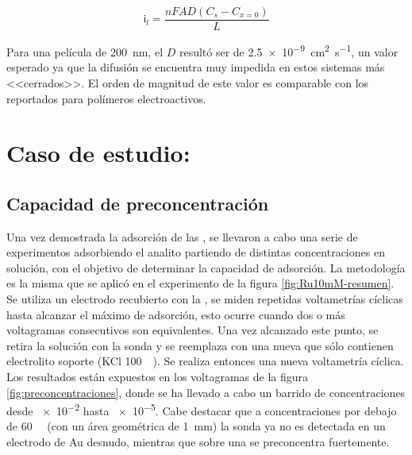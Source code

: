 			\begin{equation}
					\text{i}_l = \frac{nFAD(C_{s}-C_{x=0})}{L}
					\label{eq:de-ferroceno-bajaT}
			\end{equation}
			  	

		Para una película de \SI{200}{nm}, el $D$ resultó ser de \SI{2.5e-9}{\square\cm\per\second}, un valor esperado ya que la difusión se encuentra muy impedida en estos sistemas más <<cerrados>>. El orden de magnitud de este valor es comparable con los reportados para polímeros electroactivos.\cite{Kolb1993}
			
\section{Caso de estudio: \texorpdfstring{\aminorutenioCompleto}{Ru(NH3)CL3}}
	
	\subsection{Capacidad de preconcentración}

		Una vez demostrada la adsorción \ru\space de las \pdm, se llevaron a cabo una serie de experimentos adsorbiendo el analito partiendo de distintas concentraciones en solución, con el objetivo de determinar la capacidad de adsorción. La metodología es la misma que se aplicó en el experimento de la figura \ref{fig:Ru10mM-resumen}. Se utiliza un electrodo recubierto con la \pdmF, se miden repetidas voltametrías cíclicas hasta alcanzar el máximo de adsorción, esto ocurre cuando dos o más voltagramas consecutivos son equivalentes. Una vez alcanzado este punto, se retira la solución con la sonda y se reemplaza con una nueva que sólo contienen electrolito soporte (KCl \SI{100}{\milli\Molar}). Se realiza entonces una nueva voltametría cíclica. Los resultados están expuestos en los voltagramas de la figura \ref{fig:preconcentraciones}, donde se ha llevado a cabo un barrido de concentraciones desde \SI{e-2}{\Molar} hasta \SI{e-5}{\Molar}. Cabe destacar que a concentraciones por debajo de \SI{60}{\micro\Molar} (con un área geométrica de \SI{1}{mm}) la sonda ya no es detectada en un electrodo de Au desnudo, mientras que sobre una \pdm\space se preconcentra fuertemente.


